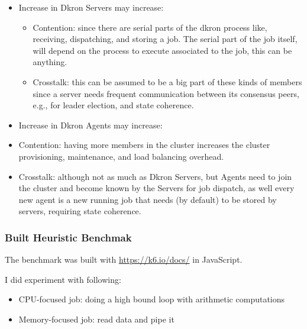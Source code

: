 \documentclass[runningheads]{llncs}
\begin{document}
\begin{itemize}
    \item Increase in Dkron Servers may increase:
     \begin{itemize}
        \item Contention: since there are serial parts of the dkron process like,
        receiving, dispatching, and storing a job. The serial part of the job itself, will
        depend on the process to execute associated to the job, this can be anything.
        \item Crosstalk: this can be assumed to be a big part of these kinds of members since
        a server needs frequent communication between its consensus peers, e.g., for
        leader election, and state coherence.
     \end{itemize}
    \item Increase in Dkron Agents may increase:
     \item Contention: having more members in the cluster increases the cluster provisioning, maintenance,
     and load balancing overhead.
     \item Crosstalk: although not as much as Dkron Servers, but Agents need to join the cluster and become
     known by the Servers for job dispatch, as well every new agent is a new running job that needs (by default)
     to be stored by servers, requiring state coherence.
\end{itemize}



\subsubsection{Built Heuristic Benchmak}

The benchmark was built with \href{K6}{https://k6.io/docs/} in JavaScript.

I did experiment with following:
\begin{itemize}
    \item CPU-focused job: doing a high bound loop with arithmetic computations
    \item Memory-focused job: read data and pipe it
\end{itemize}
\end{document}
